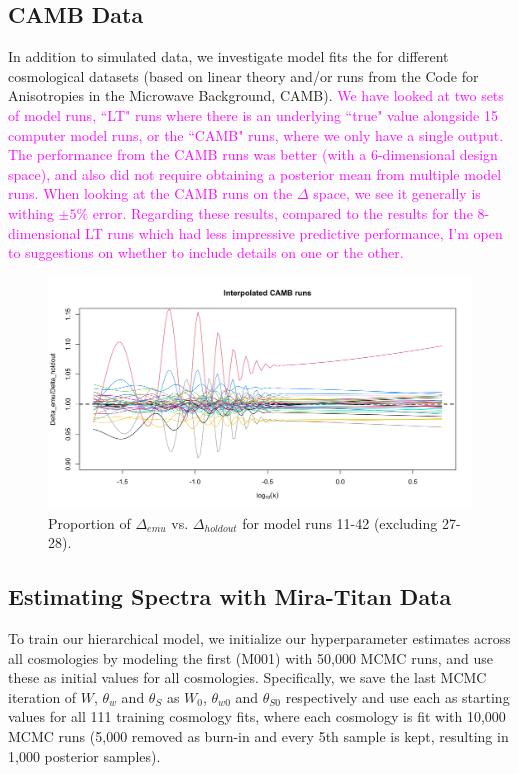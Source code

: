 \documentclass[11pt]{article}
\begin{document}
\subsection{CAMB Data}
\label{subsec:camb}

In addition to simulated data, we investigate model fits the for different cosmological datasets (based on linear theory and/or runs from the Code for Anisotropies in the Microwave Background, CAMB). \textcolor{magenta}{We have looked at two sets of model runs, ``LT" runs where there is an underlying ``true" value alongside 15 computer model runs, or the ``CAMB" runs, where we only have a single output. The performance from the CAMB runs was better (with a 6-dimensional design space), and also did not require obtaining a posterior mean from multiple model runs. When looking at the CAMB runs on the $\Delta$ space, we see it generally is withing $\pm 5\%$ error. Regarding these results, compared to the results for the 8-dimensional LT runs which had less impressive predictive performance, I'm open to suggestions on whether to include details on one or the other.}

\begin{figure}
    \centering
    \includegraphics[width=6in]{plot_pca_CAMB.png}
    \caption{Proportion of $\Delta_{emu}$ vs. $\Delta_{holdout}$ for model runs 11-42 (excluding 27-28).}   
    \label{fig:pca_camb}
\end{figure}


\subsection{Estimating Spectra with Mira-Titan Data}
\label{subsec:mira_fit}

To train our hierarchical model, we initialize our hyperparameter estimates across all cosmologies by modeling the first (M001) with 50,000 MCMC runs, and use these as initial values for all cosmologies. Specifically, we save the last MCMC iteration of $W$, $\theta_w$ and $\theta_S$ as $W_0$, $\theta_{w0}$ and $\theta_{S0}$ respectively and use each as starting values for all 111 training cosmology fits, where each cosmology is fit with 10,000 MCMC runs (5,000 removed as burn-in and every 5th sample is kept, resulting in 1,000 posterior samples).
\end{document}
